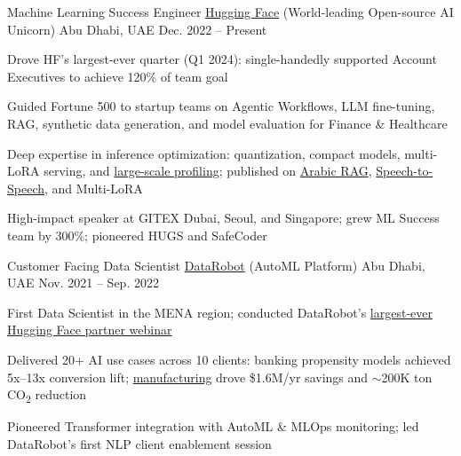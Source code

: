 

\begin{cventries}

  \cventry
    {Machine Learning Success Engineer} %
    {\href{https://www.huggingface.co/}{Hugging Face} (World-leading Open-source AI Unicorn)} %
    {Abu Dhabi, UAE} %
    {Dec. 2022 -- Present} %
    {
      \begin{cvitems} %
        \item {Drove HF's largest-ever quarter (Q1 2024): single-handedly supported Account Executives to achieve 120\% of team goal}
        \item {Guided Fortune 500 to startup teams on Agentic Workflows, LLM fine-tuning, RAG, synthetic data generation, and model evaluation for Finance \& Healthcare}
        \item {Deep expertise in inference optimization: quantization, compact models, multi-LoRA serving, and \href{https://huggingface.co/blog/billion-classifications}{large-scale profiling}; published on \href{https://datavistics.github.io/posts/arabic-rag-1/}{Arabic RAG}, \href{https://huggingface.co/spaces/derek-thomas/fawkes}{Speech-to-Speech}, and Multi-LoRA}
        \item {High-impact speaker at GITEX Dubai, Seoul, and Singapore; grew ML Success team by 300\%; pioneered HUGS and SafeCoder}
      \end{cvitems}
    }

  \cventry
    {Customer Facing Data Scientist} %
    {\href{https://www.datarobot.com/}{DataRobot} (AutoML Platform)} %
    {Abu Dhabi, UAE} %
    {Nov. 2021 -- Sep. 2022} %
    {
      \begin{cvitems} %
        \item {First Data Scientist in the MENA region; conducted DataRobot's \href{https://www.datarobot.com/webinars/getting-started-with-transformers-and-mlops/}{largest-ever Hugging Face partner webinar}}
        \item {Delivered 20+ AI use cases across 10 clients: banking propensity models achieved 5x--13x conversion lift; \href{https://www.datarobot.com/customers/oyak/}{manufacturing} drove \$1.6M/yr savings and $\sim$200K ton CO\textsubscript{2} reduction}
        \item {Pioneered Transformer integration with AutoML \& MLOps monitoring; led DataRobot's first NLP client enablement session}
      \end{cvitems}
    }


\end{cventries}
